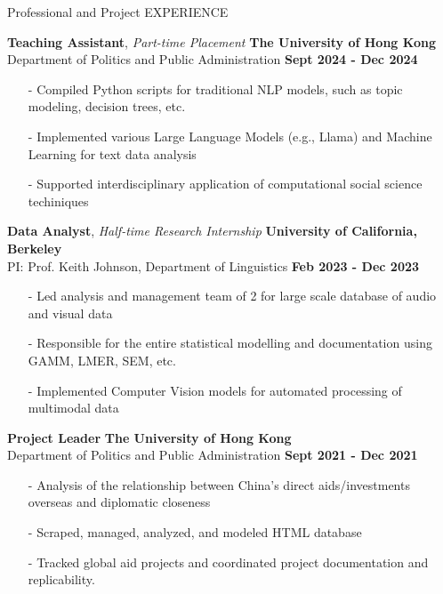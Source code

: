 \documentclass{resume} %
\begin{document}
\begin{rSection}{Professional and Project EXPERIENCE}

{\textbf{Teaching Assistant}, \textit{Part-time Placement}} \hfill \textbf{The University of Hong Kong}\\
\phantom{A}Department of Politics and Public Administration   \hfill \textbf{Sept 2024 - Dec 2024} 
\begin{enumerate}[parsep=0pt,topsep=0pt, partopsep=0pt]
  \item[-] Compiled Python scripts for traditional NLP models, such as topic modeling, decision trees, etc.
  \item[-] Implemented various Large Language Models (e.g., Llama) and Machine Learning for text data analysis
  \item[-] Supported interdisciplinary application of computational social science techiniques
\end{enumerate}

{\textbf{Data Analyst}, \textit{Half-time Research Internship}} \hfill \textbf{University of California, Berkeley} \\
\phantom{A}PI: Prof. Keith Johnson, Department of Linguistics \hfill \textbf{Feb 2023 - Dec 2023} 
\begin{enumerate}[parsep=0pt,topsep=0pt, partopsep=0pt]
  \item[-] Led analysis and management team of 2 for large scale database of audio and visual data
  \item[-] Responsible for the entire statistical modelling and documentation using GAMM, LMER, SEM, etc.
  \item[-] Implemented Computer Vision models for automated processing of multimodal data
\end{enumerate}

{\textbf{Project Leader} \textit{}} \hfill \textbf{The University of Hong Kong}\\
\phantom{A}Department of Politics and Public Administration  \hfill \textbf{Sept 2021 - Dec 2021} 
\begin{enumerate}[parsep=0pt,topsep=0pt, partopsep=0pt]
  \item[-] Analysis of the relationship between China's direct aids/investments overseas and diplomatic closeness
  \item[-] Scraped, managed, analyzed, and modeled HTML database 
  \item[-] Tracked global aid projects and coordinated project documentation and replicability.


\end{enumerate}
\end{rSection}
\end{document}
